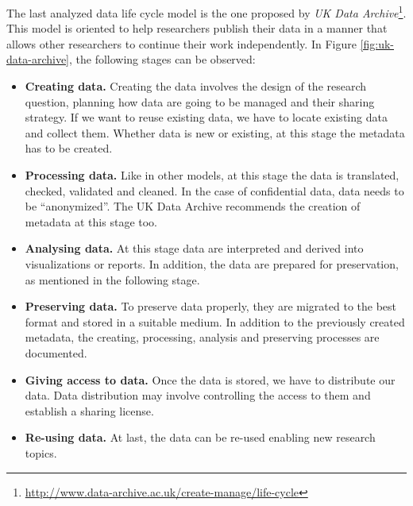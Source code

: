 The last analyzed data life cycle model is the one proposed by \textit{UK Data Archive}\footnote{\url{http://www.data-archive.ac.uk/create-manage/life-cycle}}. This model is oriented to help researchers publish their data in a manner that allows other researchers to continue their work independently. In Figure \ref{fig:uk-data-archive}, the following stages can be observed:
\begin{itemize}
    \item \textbf{Creating data.} Creating the data involves the design of the research question, planning how data are going to be managed and their sharing strategy. If we want to reuse existing data, we have to locate existing data and collect them. Whether data is new or existing, at this stage the metadata has to be created.
    \item \textbf{Processing data.} Like in other models, at this stage the data is translated, checked, validated and cleaned. In the case of confidential data, data needs to be ``anonymized''. The UK Data Archive recommends the creation of metadata at this stage too.
    \item \textbf{Analysing data.} At this stage data are interpreted and derived into visualizations or reports. In addition, the data are prepared for preservation, as mentioned in the following stage.
    \item \textbf{Preserving data.} To preserve data properly, they are migrated to the best format and stored in a suitable medium. In addition to the previously created metadata, the creating, processing, analysis and preserving processes are documented.
    \item \textbf{Giving access to data.} Once the data is stored, we have to distribute our data. Data distribution may involve controlling the access to them and establish a sharing license.
    \item \textbf{Re-using data.} At last, the data can be re-used enabling new research topics.
\end{itemize}


